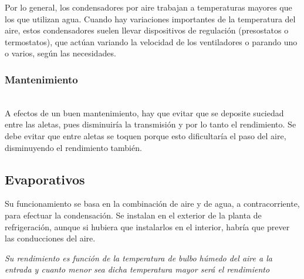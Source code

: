 Por lo general, los condensadores por aire trabajan a temperaturas mayores que los que utilizan agua. Cuando hay variaciones importantes de la temperatura del aire, estos condensadores suelen llevar dispositivos de regulaci\'on (presostatos o termostatos), que act\'uan variando la velocidad de los ventiladores o parando uno o varios, seg\'un las necesidades.\\
\subsubsection{Mantenimiento}\\
A efectos de un buen mantenimiento, hay que evitar que se deposite suciedad entre las aletas, pues disminuir\'ia la transmisi\'on y por lo tanto el rendimiento. Se debe evitar que entre aletas se toquen porque esto dificultar\'ia el paso del aire, disminuyendo el rendimiento tambi\'en.

\subsection{Evaporativos}
Su funcionamiento se basa en la combinaci\'on de aire y de agua, a contracorriente, para efectuar la condensaci\'on. Se instalan en el exterior de la planta de refrigeraci\'on, aunque si hubiera que instalarlos en el interior, habr\'ia que prever las conducciones del aire.

\emph{Su rendimiento es funci\'on de la temperatura de bulbo h\'umedo del aire a la entrada y cuanto menor sea dicha temperatura mayor ser\'a el rendimiento}

